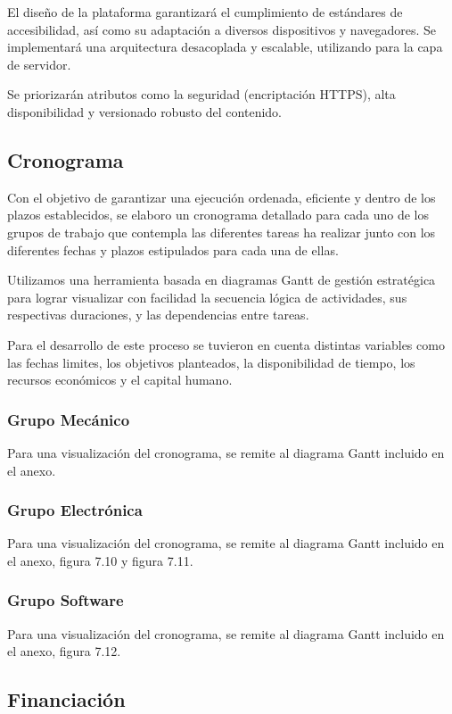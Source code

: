     El diseño de la plataforma garantizará el cumplimiento de estándares de accesibilidad, así como
    su adaptación a diversos dispositivos y navegadores. Se implementará una arquitectura desacoplada
    y escalable, utilizando para la capa de servidor.

    Se priorizarán atributos como la seguridad (encriptación HTTPS), alta disponibilidad y versionado
    robusto del contenido.


  \subsection{Cronograma}
    Con el objetivo de garantizar una ejecución ordenada, eficiente y dentro de los plazos
    establecidos, se elaboro un cronograma detallado para cada uno de los grupos de trabajo que
    contempla las diferentes tareas ha realizar junto con los diferentes fechas y plazos estipulados
    para cada una de ellas.

    Utilizamos una herramienta basada en diagramas Gantt de gestión estratégica para lograr
    visualizar con facilidad la secuencia lógica de actividades, sus respectivas duraciones, y las
    dependencias entre tareas.

    Para el desarrollo de este proceso se tuvieron en cuenta distintas variables como las fechas
    limites, los objetivos planteados, la disponibilidad de tiempo, los recursos económicos y el
    capital humano.

    \subsubsection{Grupo Mecánico}
    Para una visualización del cronograma, se remite al diagrama Gantt incluido en el anexo.
    \subsubsection{Grupo Electrónica}
    Para una visualización del cronograma, se remite al diagrama Gantt incluido en el anexo,
    figura 7.10 y figura 7.11.
    \subsubsection{Grupo Software}
    Para una visualización del cronograma, se remite al diagrama Gantt incluido en el anexo,
    figura 7.12.

  \subsection{Financiaci\'on}

